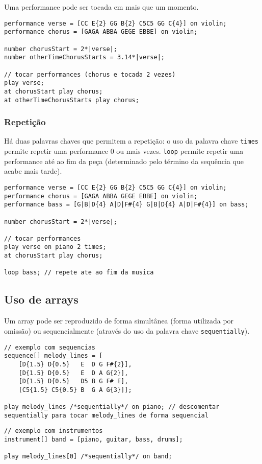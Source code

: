 \documentclass{article}
\begin{document}
Uma performance pode ser tocada em mais que um momento.
\begin{lstlisting} 
performance verse = [CC E{2} GG B{2} C5C5 GG C{4}] on violin;
performance chorus = [GAGA ABBA GEGE EBBE] on violin;

number chorusStart = 2*|verse|;
number otherTimeChorusStarts = 3.14*|verse|;

// tocar performances (chorus e tocada 2 vezes)
play verse;
at chorusStart play chorus;
at otherTimeChorusStarts play chorus;
\end{lstlisting}

\subsubsection{Repetição}
Há duas palavras chaves que permitem a repetição: o uso da palavra chave \texttt{times} permite repetir uma performance 0 ou mais vezes. \texttt{loop} permite repetir uma performance até ao fim da peça (determinado pelo término da sequência que acabe mais tarde).
\begin{lstlisting} 
performance verse = [CC E{2} GG B{2} C5C5 GG C{4}] on violin;
performance chorus = [GAGA ABBA GEGE EBBE] on violin;
performance bass = [G|B|D{4} A|D|F#{4} G|B|D{4} A|D|F#{4}] on bass;

number chorusStart = 2*|verse|;

// tocar performances
play verse on piano 2 times;
at chorusStart play chorus;

loop bass; // repete ate ao fim da musica
\end{lstlisting}

\subsection{Uso de arrays}
Um array pode ser reproduzido de forma simultânea (forma utilizada por omissão) ou sequencialmente (através do uso da palavra chave \texttt{sequentially}).

\begin{lstlisting} 
// exemplo com sequencias
sequence[] melody_lines = [
    [D{1.5} D{0.5}   E  D G F#{2}], 
    [D{1.5} D{0.5}   E  D A G{2}],
    [D{1.5} D{0.5}   D5 B G F# E],
    [C5{1.5} C5{0.5} B  G A G{3}]];

play melody_lines /*sequentially*/ on piano; // descomentar sequentially para tocar melody_lines de forma sequencial
\end{lstlisting}

\begin{lstlisting} 
// exemplo com instrumentos
instrument[] band = [piano, guitar, bass, drums];

play melody_lines[0] /*sequentially*/ on band;
\end{lstlisting}
\end{document}
